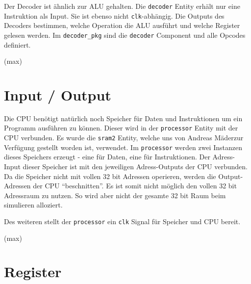 \documentclass[paper=a4,fontsize=12pt,twocolumn]{scrreprt}
\begin{document}
Der Decoder ist ähnlich zur ALU gehalten.
Die \texttt{decoder} Entity erhält nur eine Instruktion als Input.
Sie ist ebenso nicht \texttt{clk}-abhängig.
Die Outputs des Decoders bestimmen, welche Operation die ALU ausführt und welche Register gelesen werden.
Im \texttt{decoder\_pkg} sind die \texttt{decoder} Component und alle Opcodes definiert.


(max)

\section{Input / Output}

Die CPU benötigt natürlich noch Speicher für Daten und Instruktionen um ein Programm ausführen zu können.
Dieser wird in der \texttt{processor} Entity mit der CPU verbunden.
Es wurde die \texttt{sram2} Entity, welche uns von Andreas Mäder\footnotemark zur Verfügung gestellt worden ist, verwendet.
Im \texttt{processor} werden zwei Instanzen dieses Speichers erzeugt - eine für Daten, eine für Instruktionen.
Der Adress-Input dieser Speicher ist mit den jeweiligen Adress-Outputs der CPU verbunden.
Da die Speicher nicht mit vollen 32 bit Adressen operieren, werden die Output-Adressen der CPU \enquote{beschnitten}.
Es ist somit nicht möglich den vollen 32 bit Adressraum zu nutzen.
So wird aber nicht der gesamte 32 bit Raum beim simulieren alloziert.

Des weiteren stellt der \texttt{processor} ein \texttt{clk} Signal für Speicher und CPU bereit.

(max)

\section{Register}
\end{document}
